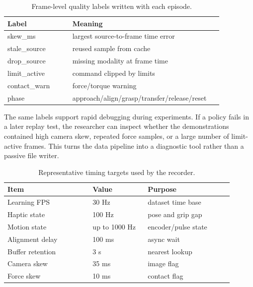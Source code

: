 \documentclass[10pt,twocolumn,letterpaper]{article}
\begin{document}
\begin{table}[t]
  \centering
  \footnotesize
  \caption{Frame-level quality labels written with each episode.}
  \label{tab:quality}
  \begin{tabular}{@{}L{0.28\linewidth}L{0.58\linewidth}@{}}
    \toprule
    Label & Meaning \\
    \midrule
    {\scriptsize skew\_ms} & largest source-to-frame time error \\
    {\scriptsize stale\_source} & reused sample from cache \\
    {\scriptsize drop\_source} & missing modality at frame time \\
    {\scriptsize limit\_active} & command clipped by limits \\
    {\scriptsize contact\_warn} & force/torque warning \\
    {\scriptsize phase} & approach/align/grasp/transfer/release/reset \\
    \bottomrule
  \end{tabular}
\end{table}

The same labels support rapid debugging during experiments. If a policy
fails in a later replay test, the researcher can inspect whether the
demonstrations contained high camera skew, repeated force samples, or a
large number of limit-active frames. This turns the data pipeline into a
diagnostic tool rather than a passive file writer.

\begin{table}[t]
  \centering
  \footnotesize
  \caption{Representative timing targets used by the recorder.}
  \label{tab:timing}
  \begin{tabular}{@{}L{0.34\linewidth}L{0.22\linewidth}L{0.34\linewidth}@{}}
    \toprule
    Item & Value & Purpose \\
    \midrule
    Learning FPS & 30 Hz & dataset time base \\
    Haptic state & 100 Hz & pose and grip gap \\
    Motion state & up to 1000 Hz & encoder/pulse state \\
    Alignment delay & 100 ms & async wait \\
    Buffer retention & 3 s & nearest lookup \\
    Camera skew & 35 ms & image flag \\
    Force skew & 10 ms & contact flag \\
    \bottomrule
  \end{tabular}
\end{table}
\end{document}
